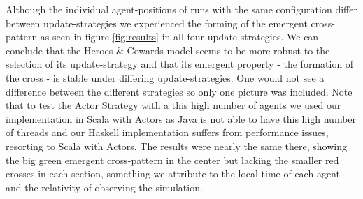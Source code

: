 Although the individual agent-positions of runs with the same configuration differ between update-strategies we experienced the forming of the emergent cross-pattern as seen in figure \ref{fig:results} in all four update-strategies. We can conclude that the Heroes \& Cowards model seems to be more robust to the selection of its update-strategy and that its emergent property - the formation of the cross - is stable under differing update-strategies. One would not see a difference between the different strategies so only one picture was included. Note that to test the Actor Strategy with a this high number of agents we used our implementation in Scala with Actors as Java is not able to have this high number of threads and our Haskell implementation suffers from performance issues, resorting to Scala with Actors. The results were nearly the same there, showing the big green emergent cross-pattern in the center but lacking the smaller red crosses in each section, something we attribute to the local-time of each agent and the relativity of observing the simulation.